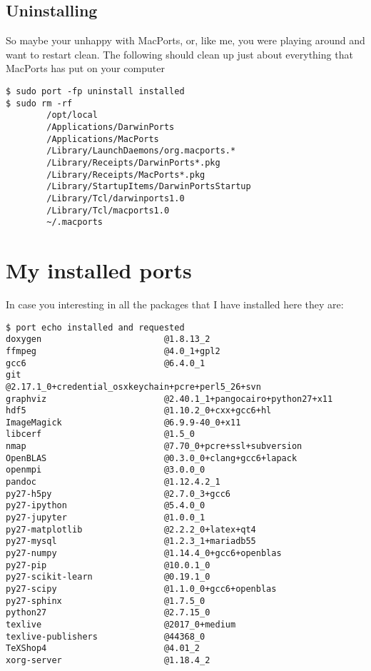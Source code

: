 \documentclass[11pt, A4paper]{article}
\begin{document}
\subsection{Uninstalling}
So maybe your unhappy with MacPorts, or, like me, you were playing around and want to restart clean. The following should clean up just about everything that MacPorts has put on your computer
\begin{lstlisting}[style=Bash]
$ sudo port -fp uninstall installed
$ sudo rm -rf
        /opt/local
        /Applications/DarwinPorts
        /Applications/MacPorts
        /Library/LaunchDaemons/org.macports.*
        /Library/Receipts/DarwinPorts*.pkg
        /Library/Receipts/MacPorts*.pkg
        /Library/StartupItems/DarwinPortsStartup
        /Library/Tcl/darwinports1.0
        /Library/Tcl/macports1.0
        ~/.macports
\end{lstlisting}



%
%
\appendix

\section{My installed ports}

In case you interesting in all the packages that I have installed here they are:
\begin{lstlisting}[style=Bash]
$ port echo installed and requested
doxygen                        @1.8.13_2 
ffmpeg                         @4.0_1+gpl2 
gcc6                           @6.4.0_1 
git                            @2.17.1_0+credential_osxkeychain+pcre+perl5_26+svn 
graphviz                       @2.40.1_1+pangocairo+python27+x11 
hdf5                           @1.10.2_0+cxx+gcc6+hl 
ImageMagick                    @6.9.9-40_0+x11 
libcerf                        @1.5_0 
nmap                           @7.70_0+pcre+ssl+subversion 
OpenBLAS                       @0.3.0_0+clang+gcc6+lapack 
openmpi                        @3.0.0_0 
pandoc                         @1.12.4.2_1 
py27-h5py                      @2.7.0_3+gcc6 
py27-ipython                   @5.4.0_0 
py27-jupyter                   @1.0.0_1 
py27-matplotlib                @2.2.2_0+latex+qt4 
py27-mysql                     @1.2.3_1+mariadb55 
py27-numpy                     @1.14.4_0+gcc6+openblas 
py27-pip                       @10.0.1_0 
py27-scikit-learn              @0.19.1_0 
py27-scipy                     @1.1.0_0+gcc6+openblas 
py27-sphinx                    @1.7.5_0 
python27                       @2.7.15_0 
texlive                        @2017_0+medium 
texlive-publishers             @44368_0 
TeXShop4                       @4.01_2 
xorg-server                    @1.18.4_2 
\end{lstlisting}
\end{document}
